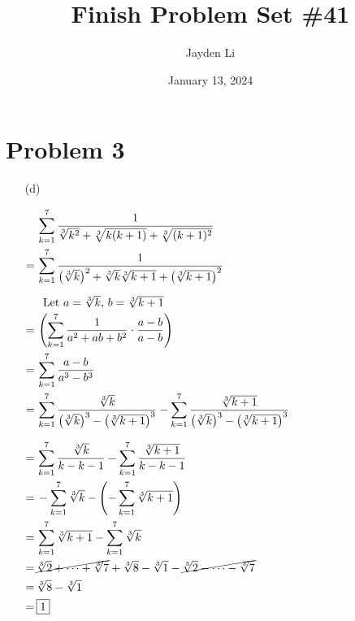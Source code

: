 \documentclass{article}
\title{Finish Problem Set \#41}
\author{Jayden Li}
\date{January 13, 2024}
\newcommand{\alignedintertext}[1]{%
	\noalign{%
		\vskip\belowdisplayshortskip
		\vtop{\hsize=\linewidth#1\par
		\expandafter}%
		\expandafter\prevdepth\the\prevdepth
	}%
}
\begin{document}

\fontsize{12pt}{12pt}\selectfont

\maketitle

\section*{Problem 3}
\begin{itemize}
\item[(d)]
\begin{minipage}[t]{0.5\linewidth}
$\begin{aligned}[t]
	&\sum_{k=1}^{7}\frac{1}{\sqrt[3]{k^2}+\sqrt[3]{k(k+1)}
		+\sqrt[3]{(k+1)^2}} \\
	=\,&\sum_{k=1}^{7}\frac{1}{\big(\sqrt[3]{k}\big)^2+
		\sqrt[3]{k}\sqrt[3]{k+1}+\left(\sqrt[3]{k+1}\right)^2} \\
	\alignedintertext{Let $a=\sqrt[3]{k}$, $b=\sqrt[3]{k+1}$}
	=\,&\left(\sum_{k=1}^{7}\frac{1}{a^2+ab+b^2}\cdot\frac
		{a-b}{a-b}\right) \\
	=\,&\sum_{k=1}^{7}\frac{a-b}{a^3-b^3} \\
	=\,&\sum_{k=1}^{7}\frac{\sqrt[3]{k}}{\big(\sqrt[3]{k}\big)^3-
		\left(\sqrt[3]{k+1}\right)^3}-\sum_{k=1}^{7}
		\frac{\sqrt[3]{k+1}}{\big(\sqrt[3]{k}\big)^3-
		\left(\sqrt[3]{k+1}\right)^3}
\end{aligned}$
\end{minipage}
\begin{minipage}[t]{0.49\linewidth}
$\begin{aligned}[t]
	=\,&\sum_{k=1}^{7}\frac{\sqrt[3]{k}}{k-k-1}-\sum_{k=1}^{7}
		\frac{\sqrt[3]{k+1}}{k-k-1} \\
	=\,&-\sum_{k=1}^{7}\sqrt[3]{k}-\left(-\sum_{k=1}^{7}
		\sqrt[3]{k+1}\right) \\
	=\,&\sum_{k=1}^{7}\sqrt[3]{k+1}-\sum_{k=1}^{7}\sqrt[3]{k} \\
	=\,&\cancel{\sqrt[3]{2}+\cdots+\sqrt[3]{7}}+\sqrt[3]{8}-
		\sqrt[3]{1}-\cancel{\sqrt[3]{2}-\cdots-\sqrt[3]{7}} \\
	=\,&\sqrt[3]{8}-\sqrt[3]{1} \\
	=\,&\boxed{1}
\end{aligned}$
\end{minipage}

\end{itemize}
\end{document}
